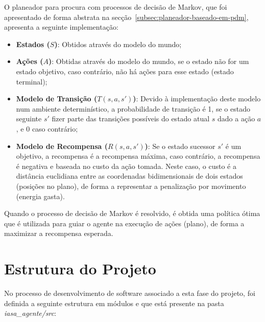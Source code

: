 O planeador para procura com processos de decisão de Markov, que foi apresentado de forma abstrata na secção~\ref{subsec:planeador-baseado-em-pdm},
apresenta a seguinte implementação:

\begin{itemize}
    \item \textbf{Estados (\(S\))}: Obtidos através do modelo do mundo;
    \item \textbf{Ações (\(A\))}: Obtidas através do modelo do mundo, se o estado não for um estado objetivo, caso contrário, não há ações para esse estado (estado terminal);
    \item \textbf{Modelo de Transição (\(T(s, a, s')\))}: Devido à implementação deste modelo num ambiente determinístico, a probabilidade de transição é 1, se o estado seguinte \(s'\) fizer parte das transições possíveis do estado atual \(s\) dado a ação \(a\), e 0 caso contrário;
    \item \textbf{Modelo de Recompensa (\(R(s, a, s')\))}: Se o estado sucessor \(s'\) é um objetivo, a recompensa é a recompensa máxima, caso contrário, a recompensa é negativa e baseada no custo da ação tomada.
    Neste caso, o custo é a distância euclidiana entre as coordenadas bidimensionais de dois estados (posições no plano), de forma a representar a penalização por movimento (energia gasta).
\end{itemize}

Quando o processo de decisão de Markov é resolvido, é obtida uma política ótima que é utilizada para guiar o agente na execução de ações (plano), de forma a maximizar a recompensa esperada.


\section{Estrutura do Projeto}\label{sec:estrutura-do-projeto-4}

No processo de desenvolvimento de software associado a esta fase do projeto, foi definida a seguinte estrutura em módulos e que está presente na pasta \textit{iasa\_agente/src}:

